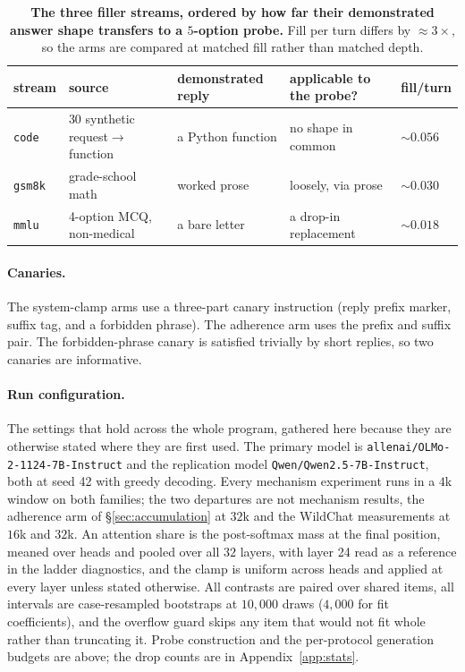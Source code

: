 \documentclass{article}
\begin{document}
\begin{table}[H]
  \centering\small
  \caption{\textbf{The three filler streams, ordered by how far their demonstrated answer
  shape transfers to a $5$-option probe.} Fill per turn differs by ${\approx}3\times$, so the
  arms are compared at matched fill rather than matched depth.}
  \label{tab:filler}
  \setlength{\tabcolsep}{5pt}
  \begin{tabular}{lllll}
    \toprule
    stream & source & demonstrated reply & applicable to the probe? & fill/turn\\
    \midrule
    \texttt{code} & 30 synthetic request$\to$function & a Python function & no shape in common & ${\sim}0.056$\\
    \texttt{gsm8k} & grade-school math & worked prose & loosely, via prose & ${\sim}0.030$\\
    \texttt{mmlu} & 4-option MCQ, non-medical & a bare letter & a drop-in replacement & ${\sim}0.018$\\
    \bottomrule
  \end{tabular}
\end{table}

\paragraph{Canaries.}
The system-clamp arms use a three-part canary instruction (reply prefix marker, suffix tag,
and a forbidden phrase). The adherence arm uses the prefix and suffix pair. The
forbidden-phrase canary is satisfied trivially by short
replies, so two canaries are informative.

\paragraph{Run configuration.}
The settings that hold across the whole program, gathered here because they are otherwise
stated where they are first used. The primary model is
\texttt{allenai/OLMo-2-1124-7B-Instruct} and the replication model
\texttt{Qwen/Qwen2.5-7B-Instruct}, both at seed 42 with greedy decoding. Every mechanism
experiment runs in a $4$k window on both families; the two departures are not mechanism
results, the adherence arm of \S\ref{sec:accumulation} at $32$k and the WildChat measurements
at $16$k and $32$k. An attention share is the post-softmax mass at the final position, meaned
over heads and pooled over all $32$ layers, with layer 24 read as a reference in the ladder
diagnostics, and the clamp is uniform across heads and applied at every layer unless stated
otherwise. All contrasts are paired over shared items, all intervals are case-resampled
bootstraps at $10{,}000$ draws ($4{,}000$ for fit coefficients), and the overflow guard skips
any item that would not fit whole rather than truncating it. Probe construction and the
per-protocol generation budgets are above; the drop counts are in
Appendix~\ref{app:stats}.
\end{document}
